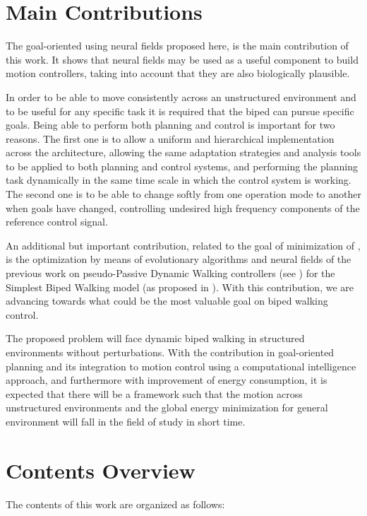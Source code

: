 \section{Main Contributions}
The goal-oriented  using neural fields
proposed here, is the main contribution of this work. It shows that
neural fields may be used as a useful component to build motion
controllers, taking into account that they are also biologically
plausible.

In order to be able to move consistently across an unstructured
environment and to be useful for any specific task it is required that
the biped can pursue specific goals. Being able to perform both
planning and control is important for two reasons. The first one is to
allow a uniform and hierarchical implementation across the
architecture, allowing the same adaptation strategies and analysis
tools to be applied to both planning and control systems, and
performing the planning task dynamically in the same time scale in
which the control system is working. The second one is to be able to
change softly from one operation mode to another when goals have
changed, controlling undesired high frequency components of the
reference control signal.

An additional but important contribution, related to the goal of
minimization of \!, is the
optimization by means of evolutionary algorithms and neural fields of
the previous work on pseudo-Passive Dynamic Walking controllers (see
\cite{Wisse05How}) for the Simplest Biped Walking model (as proposed
in \cite{Garcia98simplest}). With this contribution, we are advancing
towards what could be the most valuable goal on biped walking control.

The proposed problem will face dynamic biped walking in structured
environments without perturbations. With the contribution in
goal-oriented planning and its integration to motion control using a
computational intelligence approach, and furthermore with improvement
of energy consumption, it is expected that there will be a framework
such that the motion across unstructured environments and the global
energy minimization for general environment will fall in the field of
study in short time.

\section{Contents Overview}
The contents of this work are organized as follows:

